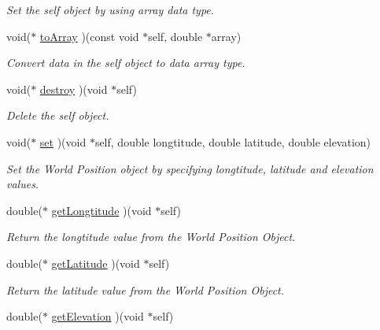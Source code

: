 \begin{CompactItemize}
\begin{CompactList}\small\item\em Set the self object by using array data type. \item\end{CompactList}\item 
void($\ast$ \hyperlink{structdrdc__WPosn__t_45788bc5d5ba40aa2890961c2364c9fc}{toArray} )(const void $\ast$self, double $\ast$array)
\begin{CompactList}\small\item\em Convert data in the self object to data array type. \item\end{CompactList}\item 
void($\ast$ \hyperlink{structdrdc__WPosn__t_00eb6655406a586c34d82e77117ec8d8}{destroy} )(void $\ast$self)
\begin{CompactList}\small\item\em Delete the self object. \item\end{CompactList}\item 
void($\ast$ \hyperlink{structdrdc__WPosn__t_fd8e615f0e7a48e527bb5b55106778a6}{set} )(void $\ast$self, double longtitude, double latitude, double elevation)
\begin{CompactList}\small\item\em Set the World Position object by specifying longtitude, latitude and elevation values. \item\end{CompactList}\item 
double($\ast$ \hyperlink{structdrdc__WPosn__t_c3719421bea672a15fd2163ecb4db363}{getLongtitude} )(void $\ast$self)
\begin{CompactList}\small\item\em Return the longtitude value from the World Position Object. \item\end{CompactList}\item 
double($\ast$ \hyperlink{structdrdc__WPosn__t_4482117daa37ce978f11917980821117}{getLatitude} )(void $\ast$self)
\begin{CompactList}\small\item\em Return the latitude value from the World Position Object. \item\end{CompactList}\item 
double($\ast$ \hyperlink{structdrdc__WPosn__t_cdea4c899a633aad0c32150bcce1b0b6}{getElevation} )(void $\ast$self)

\end{CompactItemize}
